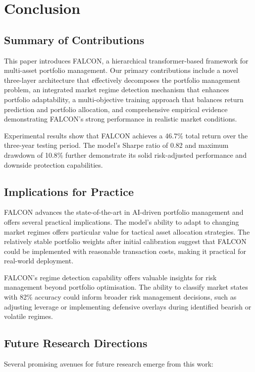 \documentclass[conference]{IEEEtran}
\begin{document}
\section{Conclusion}

\subsection{Summary of Contributions}
This paper introduces FALCON, a hierarchical transformer-based framework for multi-asset portfolio management. Our primary contributions include a novel three-layer architecture that effectively decomposes the portfolio management problem, an integrated market regime detection mechanism that enhances portfolio adaptability, a multi-objective training approach that balances return prediction and portfolio allocation, and comprehensive empirical evidence demonstrating FALCON's strong performance in realistic market conditions.

Experimental results show that FALCON achieves a 46.7\% total return over the three-year testing period. The model's Sharpe ratio of 0.82 and maximum drawdown of 10.8\% further demonstrate its solid risk-adjusted performance and downside protection capabilities.

\subsection{Implications for Practice}
FALCON advances the state-of-the-art in AI-driven portfolio management and offers several practical implications. The model's ability to adapt to changing market regimes offers particular value for tactical asset allocation strategies. The relatively stable portfolio weights after initial calibration suggest that FALCON could be implemented with reasonable transaction costs, making it practical for real-world deployment.

FALCON's regime detection capability offers valuable insights for risk management beyond portfolio optimisation. The ability to classify market states with 82\% accuracy could inform broader risk management decisions, such as adjusting leverage or implementing defensive overlays during identified bearish or volatile regimes.

\subsection{Future Research Directions}
Several promising avenues for future research emerge from this work:
\end{document}

